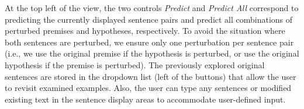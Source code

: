 At the top left of the view, the two controls \emph{Predict} and \emph{Predict All} correspond to predicting the currently displayed sentence pairs and predict all combinations of perturbed premises and hypotheses, respectively.
%
To avoid the situation where both sentences are perturbed, we ensure only one perturbation per sentence pair (i.e., we use the original premise if the hypothesis is perturbed, or use the original hypothesis if the premise is perturbed).
The previously explored original sentences are stored in the dropdown list (left of the buttons) that allow the user to revisit examined examples.
Also, the user can type any sentences or modified existing text in the sentence display areas to accommodate user-defined input.



